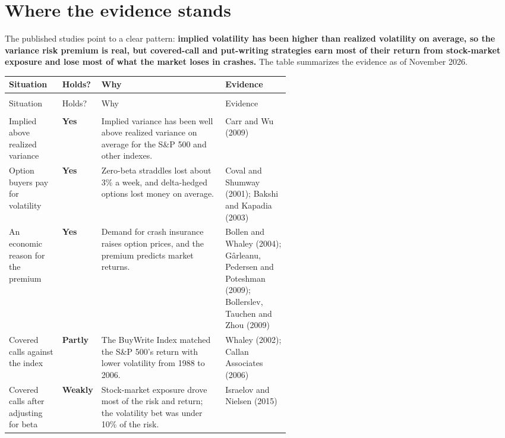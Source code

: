 \section{Where the evidence stands}
\label{sec:16-verdict}

The published studies point to a clear pattern: \textbf{implied volatility has been higher than realized volatility on average, so the variance risk premium is real, but covered-call and put-writing strategies earn most of their return from stock-market exposure and lose most of what the market loses in crashes.} The table summarizes the evidence as of November 2026.

{\small
\begin{longtable}{@{}>{\raggedright\arraybackslash}p{0.19\linewidth}>{\raggedright\arraybackslash}p{0.13\linewidth}>{\raggedright\arraybackslash}p{}>{\raggedright\arraybackslash}p{0.23\linewidth}@{}}
\toprule
Situation & Holds? & Why & Evidence \\
\midrule
\endfirsthead
\multicolumn{4}{@{}l}{\emph{(continued)}} \\
\toprule
Situation & Holds? & Why & Evidence \\
\midrule
\endhead
\midrule
\multicolumn{4}{r@{}}{\emph{(continued on the next page)}} \\
\endfoot
\bottomrule
\endlastfoot
Implied above realized variance & \textbf{Yes} & Implied variance has been well above realized variance on average for the S\&P 500 and other indexes. & Carr and Wu (2009) \\*
\addlinespace[3pt]
Option buyers pay for volatility & \textbf{Yes} & Zero-beta straddles lost about 3\% a week, and delta-hedged options lost money on average. & Coval and Shumway (2001); Bakshi and Kapadia (2003) \\
\addlinespace[3pt]
An economic reason for the premium & \textbf{Yes} & Demand for crash insurance raises option prices, and the premium predicts market returns. & Bollen and Whaley (2004); G\^arleanu, Pedersen and Poteshman (2009); Bollerslev, Tauchen and Zhou (2009) \\
\addlinespace[3pt]
Covered calls against the index & \textbf{Partly} & The BuyWrite Index matched the S\&P 500's return with lower volatility from 1988 to 2006. & Whaley (2002); Callan Associates (2006) \\
\addlinespace[3pt]
Covered calls after adjusting for beta & \textbf{Weakly} & Stock-market exposure drove most of the risk and return; the volatility bet was under 10\% of the risk. & Israelov and Nielsen (2015) \\

\end{longtable}}
